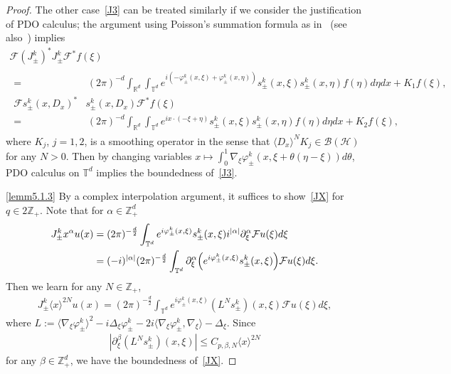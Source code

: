 \documentclass[10pt]{amsart}
\theoremstyle{definition}
\numberwithin{equation}{section}
\renewcommand{\a}{\alpha}
\renewcommand{\b}{\beta}
\newcommand{\f}{\varphi}
\newcommand{\x}{\xi}
\newcommand{\R}{\mathbb{R}}
\newcommand{\Z}{\mathbb{Z}}
\newcommand{\T}{\mathbb{T}}
\newcommand{\HS}{\mathcal{H}}
\newcommand{\FS}{\mathcal{F}}
\newcommand{\BS}{\mathcal{B}}
\newcommand{\jap}[1]{\langle #1 \rangle}
\begin{document}
\begin{proof}
The other case~\eqref{J3} can be treated similarly if we consider the justification of PDO calculus; the argument using Poisson's summation formula as in~\cite[Lemma~7.1]{N3} (see also~\cite[Lemma~2.3]{T1}) implies
\begin{multline*}
\FS \left(J_\pm^k\right)^* J_\pm^k \FS^* f(\x) \\
\begin{aligned}
=&\,(2\pi)^{-d} \int_{\R^d} \int_{\T^d} e^{i\left(-\f_{\pm}^k(x,\x)+\f_{\pm}^k(x,\eta)\right)} s_\pm^k(x,\x) s_\pm^k(x,\eta) f(\eta) d\eta dx + K_1 f(\x), \\
\FS s_\pm^k(x,D_x)^* & s_\pm^k(x,D_x) \FS^* f(\x) \\
=&\,(2\pi)^{-d} \int_{\R^d} \int_{\T^d} e^{i x\cdot(-\x+\eta)} s_\pm^k(x,\x) s_\pm^k(x,\eta) f(\eta) d\eta dx + K_2 f(\x),
\end{aligned}
\end{multline*}
where $K_j$, $j=1,2$, is a smoothing operator in the sense that $\jap{D_x}^N K_j \in \BS(\HS)$ for any $N>0$. Then by changing variables $x\mapsto \int_0^1 \nabla_\x\f_\pm^k(x,\x+\theta(\eta-\x))d\theta$, PDO calculus on $\T^d$ implies the boundedness of~\eqref{J3}.

\eqref{lemm5.1.3} By a complex interpolation argument, it suffices to show~\eqref{JX} for $q\in 2\Z_+$. Note that for $\a\in\Z_+^d$
\begin{align*}
 J_\pm^k x^\a u(x) 
&= (2\pi)^{-\frac{d}{2}} \int_{\T^d} e^{i\f_{\pm}^k(x,\x)}s_\pm^k(x,\x) i^{|\a|}\partial_{\x}^\a \FS u(\x) d\x \\
&= (-i)^{|\a|} (2\pi)^{-\frac{d}{2}} \int_{\T^d} \partial_{\x}^\a \Bigl(e^{i\f_{\pm}^k(x,\x)} s_\pm^k(x,\x) \Bigr) \FS u(\x) d\x. 
\end{align*}
Then we learn for any $N\in\Z_+$,
\begin{align*}
J_\pm^k \jap{x}^{2N} u(x) = (2\pi)^{-\frac{d}{2}} \int_{\T^d} e^{i\f_{\pm}^k(x,\x)} \left(L^{N}s_\pm^k\right)(x,\x) \FS u(\x) d\x,
\end{align*}
where $L := \jap{\nabla_\x\f_\pm^k}^2 - i\Delta_\x\f_\pm^k - 2i\jap{\nabla_\x\f_\pm^k,\nabla_\x} - \Delta_\x$. Since
\begin{align*}
\left|\partial_\x^\b\left(L^{N}s_\pm^k\right)(x,\x)\right| \leq C_{p,\b,N} \jap{x}^{2N}
\end{align*}
for any $\b\in\Z_+^d$, we have the boundedness of~\eqref{JX}.




\end{proof}
\end{document}

